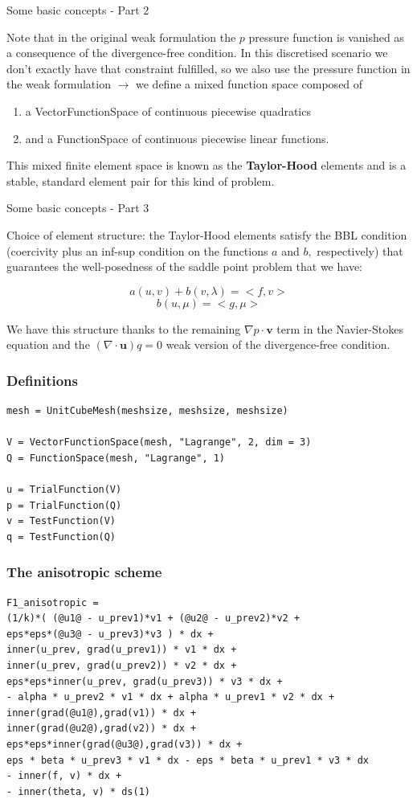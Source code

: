 \documentclass{beamer}
\begin{document}
\begin{frame}{Some basic concepts - Part 2}

Note that in the original weak formulation the $p$ pressure function is vanished as a consequence of the divergence-free condition. In this discretised scenario we don't exactly have that constraint fulfilled, so we also use the pressure function in the weak formulation $\to$ we define a mixed function space composed of
\begin{enumerate}
  \item a VectorFunctionSpace of continuous piecewise quadratics
  \item and a FunctionSpace of continuous piecewise linear functions.
\end{enumerate}
This mixed finite element space is known as the \textbf{Taylor-Hood} elements and is a stable, standard element pair for this kind of problem.

\end{frame}

\begin{frame}{Some basic concepts - Part 3}

Choice of element structure: the Taylor-Hood elements satisfy the BBL condition (coercivity plus an inf-sup condition on the functions $a$ and $b,$ respectively) that guarantees the well-posedness of the saddle point problem that we have:

$$ a(u,v) + b(v,\lambda) = <f,v>$$
$$ b(u, \mu) = <g, \mu> $$

We have this structure thanks to the remaining $\nabla p \cdot \mathbf{v}$ term in the Navier-Stokes equation and the $(\nabla \cdot \mathbf{u}) q = 0$ weak version of the divergence-free condition.
\end{frame}

\begin{frame}[fragile]
\frametitle{Definitions}
\scriptsize
\begin{lstlisting}[frame=single,style=base]
mesh = UnitCubeMesh(meshsize, meshsize, meshsize) 

V = VectorFunctionSpace(mesh, "Lagrange", 2, dim = 3)
Q = FunctionSpace(mesh, "Lagrange", 1)

u = TrialFunction(V)
p = TrialFunction(Q)
v = TestFunction(V)
q = TestFunction(Q)
\end{lstlisting}    
\end{frame}

\begin{frame}[fragile]
\frametitle{The anisotropic scheme}
\scriptsize
\begin{lstlisting}[frame=single,style=base]
F1_anisotropic =
(1/k)*( (@u1@ - u_prev1)*v1 + (@u2@ - u_prev2)*v2 + 
eps*eps*(@u3@ - u_prev3)*v3 ) * dx +
inner(u_prev, grad(u_prev1)) * v1 * dx +
inner(u_prev, grad(u_prev2)) * v2 * dx +
eps*eps*inner(u_prev, grad(u_prev3)) * v3 * dx +
- alpha * u_prev2 * v1 * dx + alpha * u_prev1 * v2 * dx +
inner(grad(@u1@),grad(v1)) * dx +
inner(grad(@u2@),grad(v2)) * dx +
eps*eps*inner(grad(@u3@),grad(v3)) * dx +
eps * beta * u_prev3 * v1 * dx - eps * beta * u_prev1 * v3 * dx
- inner(f, v) * dx +
- inner(theta, v) * ds(1)
\end{lstlisting}
\end{frame}
\end{document}
